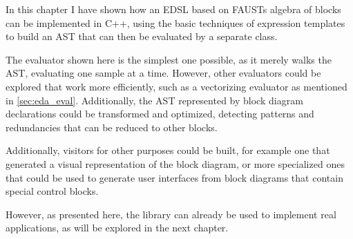 In this chapter I have shown how an EDSL based on FAUSTs algebra of blocks can be implemented in C++, using
the basic techniques of expression templates to build an AST that can then be evaluated by a separate class.

The evaluator shown here is the simplest one possible, as it merely walks the AST, evaluating one sample at a
time. However, other evaluators could be explored that work more efficiently, such as a vectorizing evaluator
as mentioned in \autoref{sec:eda_eval}. Additionally, the AST represented by block diagram declarations
could be transformed and optimized, detecting patterns and redundancies that can be reduced to other blocks.

Additionally, visitors for other purposes could be built, for example one that generated a visual
representation of the block diagram, or more specialized ones that could be used to generate user interfaces
from block diagrams that contain special control blocks.

However, as presented here, the library can already be used to implement real applications, as will be
explored in the next chapter.

